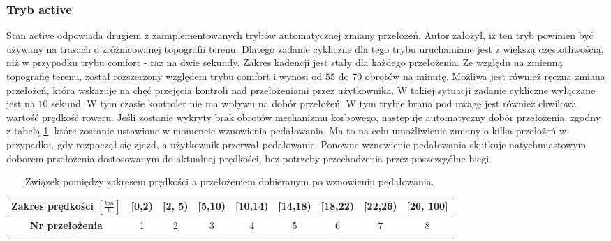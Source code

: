 \subsubsection{Tryb active}
Stan active odpowiada drugiem z zaimplementowanych trybów automatycznej zmiany przełożeń. Autor założył, iż ten tryb powinien być używany na trasach o zróżnicowanej topografii terenu. Dlatego zadanie cykliczne dla tego trybu uruchamiane jest z większą częstotliwością, niż w przypadku trybu comfort - raz na dwie sekundy. Zakres kadencji jest stały dla każdego przełożenia. Ze względu na zmienną topografię terenu, został rozszerzony względem trybu comfort i wynosi od $55$ do $70$ obrotów na minutę. Możliwa jest również ręczna zmiana przełożeń, która wskazuje na chęć przejęcia kontroli nad przełożeniami przez użytkownika. W takiej sytuacji zadanie cykliczne wyłączane jest na $10$ sekund. W tym czasie kontroler nie ma wpływu na dobór przełożeń. W tym trybie brana pod uwagę jest również chwilowa wartość prędkość roweru. Jeśli zostanie wykryty brak obrotów mechanizmu korbowego, następuje automatyczny dobór przełożenia, zgodny z tabelą \ref{tab:zakresOdPredkosci}, które zostanie ustawione w momencie wznowienia pedałowania. Ma to na celu umożliwienie zmiany o kilka przełożeń w przypadku, gdy rozpoczął się zjazd, a użytkownik przerwał pedałowanie. Ponowne wznowienie pedałowania skutkuje natychmiastowym doborem przełożenia dostosowanym do aktualnej prędkości, bez potrzeby przechodzenia przez poszczególne biegi. 
\begin{table}[h]
    \caption{Związek pomiędzy zakresem prędkości a przełożeniem dobieranym po wznowieniu pedałowania.}
    \begin{center}
		\label{tab:zakresOdPredkosci}
		\begin{tabular}{|c|c|c|c|c|c|c|c|c|}
 			\hline
 			\textbf{Zakres prędkości} $[\frac{km}{h}]$ & [0,2) & [2, 5) & [5,10) & [10,14) & [14,18) & [18,22) & [22,26) & [26, 100] \\
 			\hline
 			\textbf{Nr przełożenia} & 1 & 2 & 3 & 4 & 5 & 6 & 7 & 8 \\
			\hline
		\end{tabular}
	\end{center}
\end{table}

